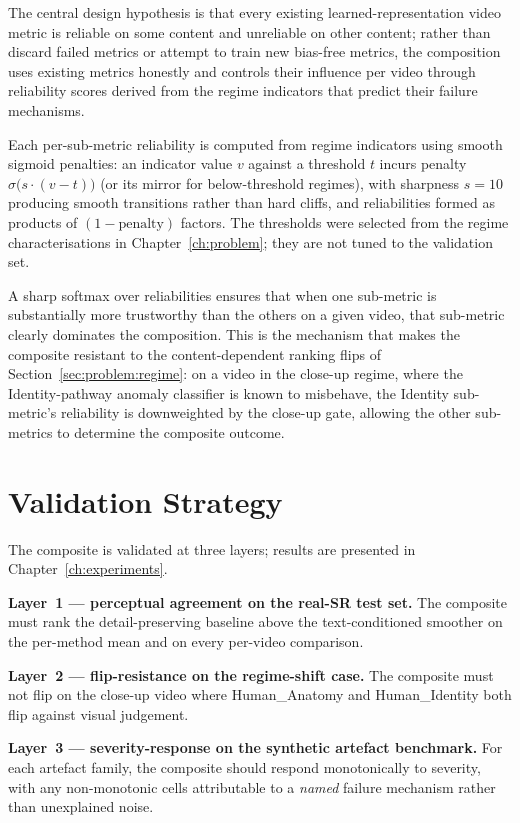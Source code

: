 The central design hypothesis is that every existing learned-representation video metric
is reliable on some content and unreliable on other content; rather than discard failed
metrics or attempt to train new bias-free metrics, the composition uses existing metrics
honestly and controls their influence per video through reliability scores derived from
the regime indicators that predict their failure mechanisms.

Each per-sub-metric reliability is computed from regime indicators using smooth sigmoid
penalties: an indicator value $v$ against a threshold $t$ incurs penalty
$\sigma\!\big(s \cdot (v - t)\big)$ (or its mirror for below-threshold regimes), with
sharpness $s = 10$ producing smooth transitions rather than hard cliffs, and
reliabilities formed as products of $(1 - \text{penalty})$ factors. The thresholds
were selected from the regime characterisations in Chapter~\ref{ch:problem}; they are
not tuned to the validation set.

A sharp softmax over reliabilities ensures that when one sub-metric is substantially more
trustworthy than the others on a given video, that sub-metric clearly dominates the
composition. This is the mechanism that makes the composite resistant to the
content-dependent ranking flips of Section~\ref{sec:problem:regime}: on a video in the
close-up regime, where the Identity-pathway anomaly classifier is known to misbehave, the
Identity sub-metric's reliability is downweighted by the close-up gate, allowing the
other sub-metrics to determine the composite outcome.

\section{Validation Strategy}
\label{sec:method:validation}

The composite is validated at three layers; results are presented in
Chapter~\ref{ch:experiments}.

\textbf{Layer~1 --- perceptual agreement on the real-SR test set.} The composite must
rank the detail-preserving baseline above the text-conditioned smoother on the per-method
mean and on every per-video comparison.

\textbf{Layer~2 --- flip-resistance on the regime-shift case.} The composite must not
flip on the close-up video where Human\_Anatomy and Human\_Identity both flip against
visual judgement.

\textbf{Layer~3 --- severity-response on the synthetic artefact benchmark.} For each
artefact family, the composite should respond monotonically to severity, with any
non-monotonic cells attributable to a \emph{named} failure mechanism rather than
unexplained noise.

